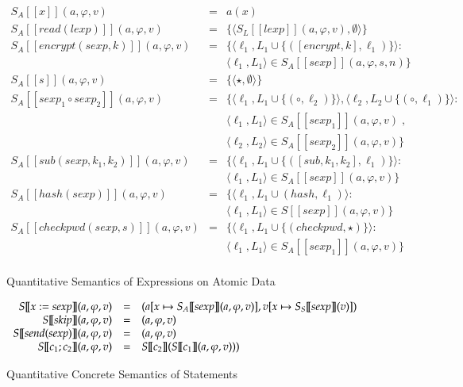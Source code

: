 \documentclass{llncs}
\begin{document}
\begin{figure}[H]
{\small \[
\begin{array}{rcl}
S_A [\![ x ]\!](a, \varphi, v) &=&  a(x)  \\
S_A [\![read(lexp)]\!](a, \varphi, v) & = & \{ \langle S_L [\![lexp ]\!](a, \varphi, v), \emptyset\rangle \}\\
S_A [\![ encrypt(sexp,k) ]\!](a, \varphi, v) &=& \{ \langle \ell_1, L_1 \cup \{([encrypt,k], \ell_1)\} \rangle : \;\\
& & \langle \ell_1, L_1 \rangle \in  S_A [\![sexp ]\!](a, \varphi, s, n) \}\; \\
S_A [\![ s]\!](a, \varphi, v) & = & \{ \langle \star, \emptyset\rangle \} \\
S_A [\![ sexp_1 \circ sexp_2 ]\!](a, \varphi, v) & = &
\{  \langle \ell_1, L_1 \cup \{(\circ, \ell_2)\} \rangle,  \langle \ell_2, L_2 \cup \{(\circ , \ell_1) \} \rangle : \; \\
& & \langle \ell_1, L_1 \rangle \in  S_A [\![sexp_1 ]\!](a, \varphi, v) \; ,\\
& & \langle \ell_2, L_2 \rangle \in  S_A [\![sexp_2]\!](a, \varphi, v) \}\; \\
S_A [\![ sub(sexp, k_1, k_2) ]\!](a, \varphi, v) & = &
\{  \langle \ell_1, L_1 \cup \{([sub,  k_1, k_2],\ell_1)\} \rangle: \\
& & \langle \ell_1, L_1\rangle \in  S_A [\![sexp ]\!](a, \varphi, v)\}\;\\
S_A [\![ hash(sexp) ]\!](a, \varphi, v) &=& \{ \langle \ell_1, L_1 \cup (hash,\ell_1) \rangle : \;\\
& &   \langle \ell_1,  L_1 \rangle \in  S [\![sexp ]\!](a, \varphi, v) \}\; \\
S_A [\![ checkpwd(sexp, s) ]\!](a, \varphi, v) & = &
\{  \langle \ell_1, L_1 \cup \{(checkpwd, \star)\} \rangle : \;\\
& & \langle \ell_1, L_1 \rangle \in  S_A [\![sexp_1 ]\!](a, \varphi, v) \}\; \\
\end{array}
\]}
\caption{Quantitative Semantics of Expressions on Atomic Data}
\label{quant_sem_ad}
\end{figure}


\begin{figure}[H]
{\small \[
\begin{array}{rcl}
S [\![x := sexp ]\!](a, \varphi, v) & = & (a[x \mapsto S_A [\![sexp ]\!](a, \varphi, v)], v[x \mapsto S_S [\![sexp ]\!](v)]) \\
S [\![skip]\!](a, \varphi, v) & = & (a, \varphi, v) \\
S [\![send(sexp)]\!](a, \varphi, v) & = & (a, \varphi, v) \\
S [\![c_1 ; c_2 ]\!](a, \varphi, v) & = &  S [\![c_2 ]\!](S [\![c_1 ]\!](a, \varphi, v) )) \\ 
\end{array}\\
\]}
\caption{Quantitative Concrete Semantics of Statements}
\label{quant_sem_stm}
\end{figure}
\end{document}
